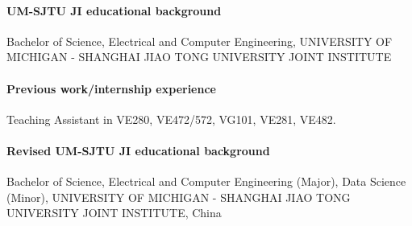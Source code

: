 \documentclass{article}
\begin{document}
\paragraph{UM-SJTU JI educational background}

Bachelor of Science, Electrical and Computer Engineering, UNIVERSITY OF MICHIGAN - SHANGHAI JIAO TONG UNIVERSITY JOINT INSTITUTE

\paragraph{Previous work/internship experience}

Teaching Assistant in VE280, VE472/572, VG101, VE281, VE482.

\paragraph{Revised UM-SJTU JI educational background}

Bachelor of Science, Electrical and Computer Engineering (Major), Data Science (Minor), UNIVERSITY OF MICHIGAN - SHANGHAI JIAO TONG UNIVERSITY JOINT INSTITUTE, China
\end{document}
